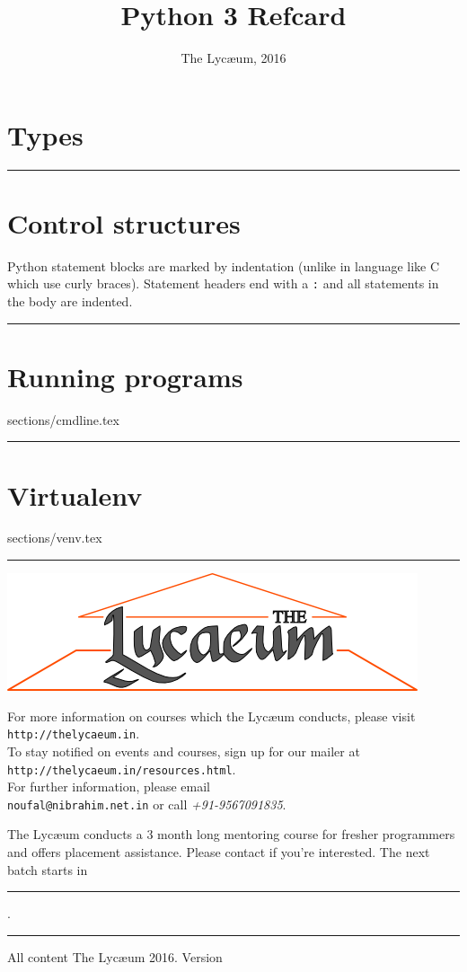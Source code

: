 \documentclass{refsheet}
\title{Python 3 Refcard}
\author{The Lyc\ae{}um, 2016}
\date{}
\begin{document}
\maketitle
\section{Types}







\noindent\rule{\linewidth}{0.05ex}
\section{Control structures}
Python statement blocks are marked by indentation (unlike in language
like C which use curly braces). Statement headers end with a
\texttt{:} and all statements in the body are indented.







\noindent\rule{\linewidth}{0.05ex}
\section{Running programs}
 {sections/cmdline.tex}

\noindent\rule{\linewidth}{0.05ex}
\section{Virtualenv}
 {sections/venv.tex}

\noindent\rule{\linewidth}{0.05ex}
\begin{center}
\includegraphics[scale=0.4]{images/parthenon-callig.png}
\end{center}
For more information on courses which the Lyc\ae{}um conducts, please
visit \texttt{http://thelycaeum.in}. \\To stay notified on events and
courses, sign up for our mailer at \texttt{http://thelycaeum.in/resources.html}. \\For further
information, please email \\\texttt{noufal@nibrahim.net.in} or call
\textit{+91-9567091835}.
\vspace{0.5cm}

The Lyc\ae{}um conducts a 3 month long mentoring course for fresher
programmers and offers placement assistance. Please contact if you're
interested. The next batch starts in \rule{4cm}{0.1ex}.

    \textcolor{lightgray}{\noindent\rule{\linewidth}{0.05ex}}
\footnotesize All content \textcopyright The Lyc\ae{}um 2016. Version 
\end{document}

